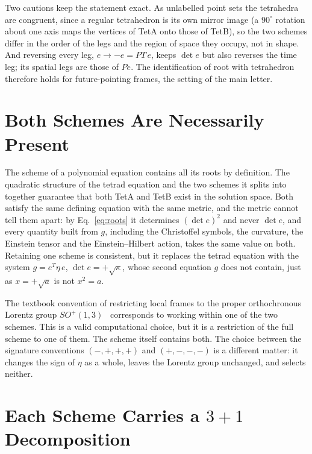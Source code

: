 \documentclass[twocolumn]{iopjournal}
\begin{document}
Two cautions keep the statement exact. As unlabelled point sets the tetrahedra are congruent, since a regular tetrahedron is its own mirror image (a $90^\circ$ rotation about one axis maps the vertices of TetA onto those of TetB), so the two schemes differ in the order of the legs and the region of space they occupy, not in shape. And reversing every leg, $e \to -e = PT\,e$, keeps $\det e$ but also reverses the time leg; its spatial legs are those of $Pe$. The identification of root with tetrahedron therefore holds for future-pointing frames, the setting of the main letter.


\section*{Both Schemes Are Necessarily Present}

The scheme of a polynomial equation contains all its roots by definition. The quadratic structure of the tetrad equation and the two schemes it splits into together guarantee that both TetA and TetB exist in the solution space. Both satisfy the same defining equation with the same metric, and the metric cannot tell them apart: by Eq.~\eqref{eq:roots} it determines $(\det e)^2$ and never $\det e$, and every quantity built from $g$, including the Christoffel symbols, the curvature, the Einstein tensor and the Einstein--Hilbert action, takes the same value on both. Retaining one scheme is consistent, but it replaces the tetrad equation with the system $g = e^T \eta\, e$, $\det e = +\sqrt{\kappa}$, whose second equation $g$ does not contain, just as $x = +\sqrt{a}$ is not $x^2 = a$.

The textbook convention of restricting local frames to the proper orthochronous Lorentz group $SO^+(1,3)$~\cite{Wald1984,Hehl1976} corresponds to working within one of the two schemes. This is a valid computational choice, but it is a restriction of the full scheme to one of them. The scheme itself contains both. The choice between the signature conventions $(-,+,+,+)$ and $(+,-,-,-)$ is a different matter: it changes the sign of $\eta$ as a whole, leaves the Lorentz group unchanged, and selects neither.


\section*{Each Scheme Carries a $3+1$ Decomposition}
\end{document}
